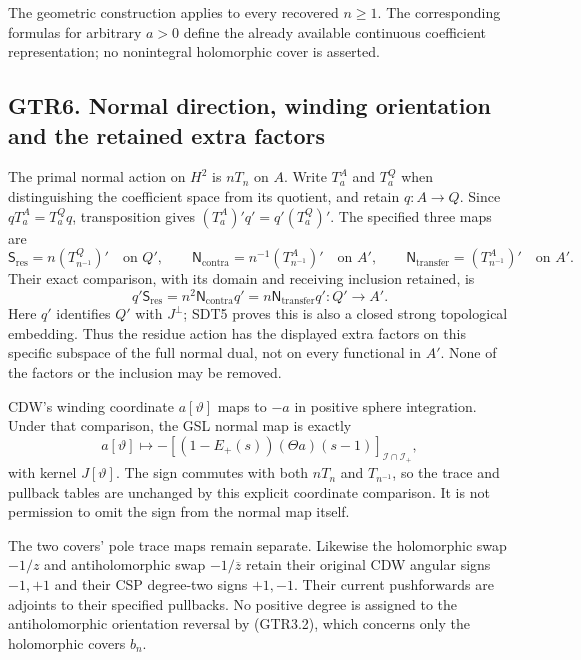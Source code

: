 The geometric construction applies to every recovered \(n\ge1\). The
corresponding formulas for arbitrary \(a>0\) define the already
available continuous coefficient representation; no nonintegral
holomorphic cover is asserted.

\subsection{GTR6. Normal direction, winding orientation and the retained
extra
factors}\label{gtr6.-normal-direction-winding-orientation-and-the-retained-extra-factors}

The primal normal action on \(H^2\) is \(nT_n\) on \(A\). Write
\(T_a^A\) and \(T_a^Q\) when distinguishing the coefficient space from
its quotient, and retain \(q:A\to Q\). Since \(qT_a^A=T_a^Qq\),
transposition gives \((T_a^A)'q'=q'(T_a^Q)'\). The specified three maps
are \[
\mathsf S_{\mathrm{res}}=n(T_{n^{-1}}^Q)'\quad\text{on }Q',\qquad
\mathsf N_{\mathrm{contra}}=n^{-1}(T_{n^{-1}}^A)'\quad\text{on }A',\qquad
\mathsf N_{\mathrm{transfer}}=(T_{n^{-1}}^A)'\quad\text{on }A'.
\] Their exact comparison, with its domain and receiving inclusion
retained, is \[
q'\mathsf S_{\mathrm{res}}
=n^2\mathsf N_{\mathrm{contra}}q'
=n\mathsf N_{\mathrm{transfer}}q':Q'\longrightarrow A'.
\tag{GTR6.0}
\] Here \(q'\) identifies \(Q'\) with \(J^\perp\); SDT5 proves this is
also a closed strong topological embedding. Thus the residue action has
the displayed extra factors on this specific subspace of the full normal
dual, not on every functional in \(A'\). None of the factors or the
inclusion may be removed.

CDW's winding coordinate \(a[\vartheta]\) maps to \(-a\) in positive
sphere integration. Under that comparison, the GSL normal map is exactly
\[
a[\vartheta]\longmapsto
-[(1-E_+(s))(\Theta a)(s-1)]_{\mathcal I\cap\mathcal I_+},
\tag{GTR6.1}
\] with kernel \(J[\vartheta]\). The sign commutes with both \(nT_n\)
and \(T_{n^{-1}}\), so the trace and pullback tables are unchanged by
this explicit coordinate comparison. It is not permission to omit the
sign from the normal map itself.

The two covers' pole trace maps remain separate. Likewise the
holomorphic swap \(-1/z\) and antiholomorphic swap \(-1/\overline z\)
retain their original CDW angular signs \(-1,+1\) and their CSP
degree-two signs \(+1,-1\). Their current pushforwards are adjoints to
their specified pullbacks. No positive degree is assigned to the
antiholomorphic orientation reversal by (GTR3.2), which concerns only
the holomorphic covers \(b_n\).

